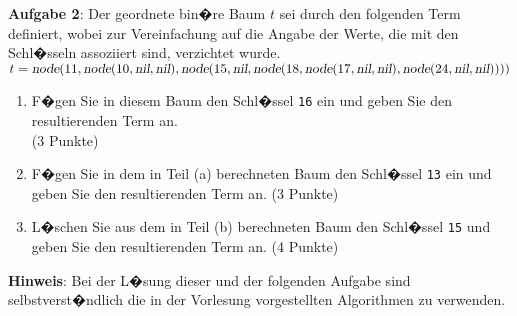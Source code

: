 \documentclass{article}
\begin{document}
\noindent
\textbf{Aufgabe 2}:
Der geordnete bin�re Baum $t$ sei durch den folgenden Term definiert,
wobei zur Vereinfachung auf die Angabe der Werte, die mit den Schl�sseln
assoziiert sind, verzichtet wurde.
\\[0.2cm]
\hspace*{1.3cm}
$t = \textsl{node}(11, \textsl{node}(10, \textsl{nil}, \textsl{nil}), \textsl{node}(15, \textsl{nil}, 
  \textsl{node}(18, \textsl{node}(17, \textsl{nil}, \textsl{nil}), 
  \textsl{node}(24, \textsl{nil}, \textsl{nil}))))
$
\begin{enumerate}
\item F�gen Sie in diesem Baum den Schl�ssel \texttt{16} ein und geben Sie den
      resultierenden Term an.  \\ 
      \hspace*{\fill} (3 Punkte)
\item F�gen Sie in dem in Teil (a) berechneten Baum den Schl�ssel \texttt{13} ein und
      geben Sie den resultierenden Term an.     
      \hspace*{\fill} (3 Punkte)
\item L�schen Sie aus dem in Teil (b) berechneten Baum den Schl�ssel \texttt{15} und
      geben Sie den resultierenden Term an. 
      \hspace*{\fill} (4 Punkte)
\end{enumerate}
\textbf{Hinweis}: Bei der L�sung dieser und der folgenden Aufgabe sind selbstverst�ndlich
die in der Vorlesung vorgestellten Algorithmen zu verwenden.
\vspace{0.3cm}
\end{document}
